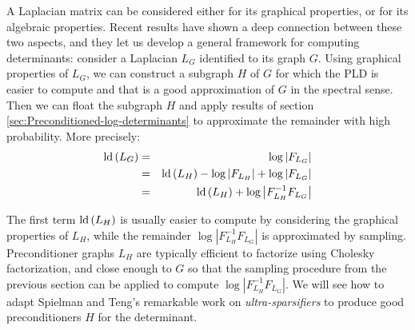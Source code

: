 A Laplacian matrix can be considered either for its graphical properties,
or for its algebraic properties. Recent results have shown a deep
connection between these two aspects, and they let us develop a general
framework for computing determinants: consider a Laplacian $L_{G}$
identified to its graph $G$. Using graphical properties of $L_{G}$,
we can construct a subgraph $H$ of $G$ for which the PLD is easier
to compute and that is a good approximation of $G$ in the spectral
sense. Then we can float the subgraph $H$ and apply results of section
\ref{sec:Preconditioned-log-determinants} to approximate the remainder
with high probability. More precisely: 
\begin{eqnarray*}
\text{\textnormal{ld}}\left(L_{G}\right) & = & \log\left|F_{L_{G}}\right|\\
 & = & \text{\textnormal{ld}}\left(L_{H}\right)-\log\left|F_{L_{H}}\right|+\log\left|F_{L_{G}}\right|\\
 & = & \text{\textnormal{ld}}\left(L_{H}\right)+\log\left|F_{L_{H}}^{-1}F_{L_{G}}\right|
\end{eqnarray*}


The first term $\text{\textnormal{ld}}\left(L_{H}\right)$ is usually easier to compute
by considering the graphical properties of $L_{H}$, while the remainder
$\log\left|F_{L_{H}}^{-1}F_{L_{G}}\right|$ is approximated by sampling.
Preconditioner graphs $L_{H}$ are typically efficient to factorize
using Cholesky factorization, and close enough to $G$ so that the
sampling procedure from the previous section can be applied to compute
$\log\left|F_{L_{H}}^{-1}F_{L_{G}}\right|$. We will see how to adapt
Spielman and Teng's remarkable work on \emph{ultra-sparsifiers} to
produce good preconditioners $H$ for the determinant. 
